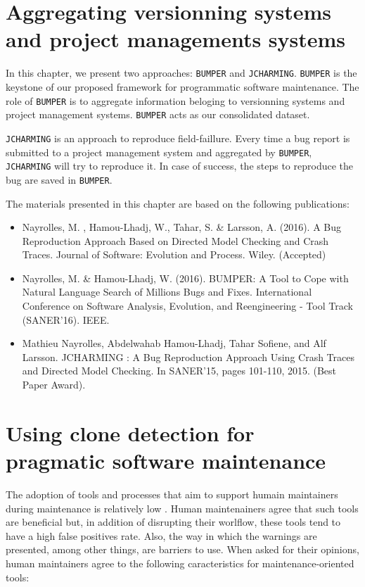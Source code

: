
\chapter{Aggregating versionning systems and project managements systems}

In this chapter, we present two approaches: {\tt BUMPER} and {\tt JCHARMING}.
{\tt BUMPER} is the keystone of our proposed framework for programmatic software maintenance.
The role of {\tt BUMPER} is to aggregate information beloging to versionning systems and project management systems.
{\tt BUMPER} acts as our consolidated dataset.

{\tt JCHARMING} is an approach to reproduce field-faillure.
Every time a bug report is submitted to a project management system and aggregated by {\tt BUMPER}, {\tt JCHARMING} will try to reproduce it.
In case of success, the steps to reproduce the bug are saved in {\tt BUMPER}.

The materials presented in this chapter are based on the following publications:

\begin{itemize}
	\item Nayrolles, M. , Hamou-Lhadj, W., Tahar, S. & Larsson, A. (2016). A Bug Reproduction Approach Based on Directed Model Checking and Crash Traces. Journal of Software: Evolution and Process. Wiley. (Accepted)
  \item Nayrolles, M. \& Hamou-Lhadj, W. (2016). BUMPER: A Tool to Cope with Natural Language Search of Millions Bugs and Fixes. International Conference on Software Analysis, Evolution, and Reengineering - Tool Track (SANER'16). IEEE.
  \item Mathieu Nayrolles, Abdelwahab Hamou-Lhadj, Tahar Sofiene, and Alf Larsson. JCHARMING : A Bug Reproduction Approach Using Crash Traces and Directed Model Checking. In SANER'15, pages 101-110, 2015. (Best Paper Award).
\end{itemize}




\chapter{Using clone detection for pragmatic software maintenance}

The adoption of tools and processes that aim to support humain maintainers during maintenance is relatively low \cite{Lewis2013,Foss2015,Layman2007,Ayewah2007,Ayewah2008,Johnson2013,Norman2013, Lopez2011}.
Human maintenainers agree that such tools are beneficial but, in addition of disrupting their worlflow, these tools tend to have a high false positives rate.
Also, the way in which the warnings are presented, among other things, are barriers to use\cite{Johnson2013}.
When asked for their opinions, human maintainers agree to the following caracteristics for maintenance-oriented tools\cite{Hovemeyer2004, Lopez2011, Lewis2013}:

